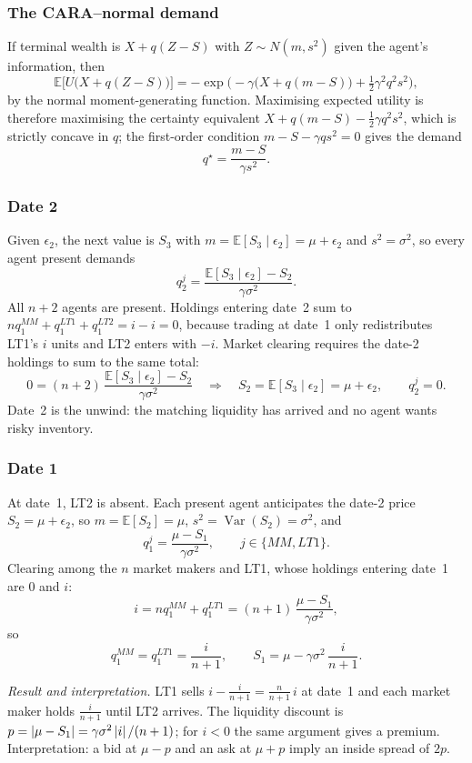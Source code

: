 \subsubsection{The CARA--normal demand}
If terminal wealth is $X+q(Z-S)$ with $Z\sim N(m,s^2)$ given the agent's information, then
\[ \mathbb{E}\big[U\big(X+q(Z-S)\big)\big]=-\exp\Big(-\gamma\big(X+q(m-S)\big)+\tfrac12\gamma^2q^2s^2\Big), \]
by the normal moment-generating function. Maximising expected utility is therefore maximising the certainty equivalent $X+q(m-S)-\tfrac12\gamma q^2s^2$, which is strictly concave in $q$; the first-order condition $m-S-\gamma qs^2=0$ gives the demand
\[ q^\star=\frac{m-S}{\gamma s^2}. \]

\subsubsection{Date 2}
Given $\epsilon_2$, the next value is $S_3$ with $m=\mathbb{E}[S_3\mid\epsilon_2]=\mu+\epsilon_2$ and $s^2=\sigma^2$, so every agent present demands
\[ q_2^{j}=\frac{\mathbb{E}[S_3\mid\epsilon_2]-S_2}{\gamma\sigma^2}. \]
All $n+2$ agents are present. Holdings entering date~2 sum to $nq_1^{MM}+q_1^{LT1}+q_1^{LT2}=i-i=0$, because trading at date~1 only redistributes LT1's $i$ units and LT2 enters with $-i$. Market clearing requires the date-2 holdings to sum to the same total:
\[ 0=(n+2)\,\frac{\mathbb{E}[S_3\mid\epsilon_2]-S_2}{\gamma\sigma^2}
\quad\Longrightarrow\quad S_2=\mathbb{E}[S_3\mid\epsilon_2]=\mu+\epsilon_2,\qquad q_2^j=0. \]
Date~2 is the unwind: the matching liquidity has arrived and no agent wants risky inventory.

\subsubsection{Date 1}
At date~1, LT2 is absent. Each present agent anticipates the date-2 price $S_2=\mu+\epsilon_2$, so $m=\mathbb{E}[S_2]=\mu$, $s^2=\operatorname{Var}(S_2)=\sigma^2$, and
\[ q_1^{j}=\frac{\mu-S_1}{\gamma\sigma^2},\qquad j\in\{MM,LT1\}. \]
Clearing among the $n$ market makers and LT1, whose holdings entering date~1 are $0$ and $i$:
\[ i=nq_1^{MM}+q_1^{LT1}=(n+1)\,\frac{\mu-S_1}{\gamma\sigma^2}, \]
so
\[ q_1^{MM}=q_1^{LT1}=\frac{i}{n+1},\qquad S_1=\mu-\gamma\sigma^2\,\frac{i}{n+1}. \]

\emph{Result and interpretation.} LT1 sells $i-\frac{i}{n+1}=\frac{n}{n+1}\,i$ at date~1 and each market maker holds $\frac{i}{n+1}$ until LT2 arrives. The liquidity discount is $p=\left\lvert\mu-S_1\right\rvert=\gamma\sigma^2\left\lvert i\right\rvert/(n+1)$; for $i<0$ the same argument gives a premium. Interpretation: a bid at $\mu-p$ and an ask at $\mu+p$ imply an inside spread of $2p$.

